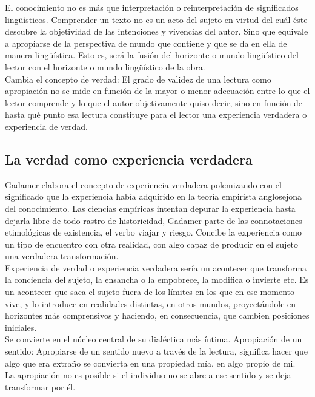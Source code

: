 \documentclass[a4paper, 11pt, twocolumn, spanish]{article}
\begin{document}
El conocimiento no es más que interpretación o reinterpretación de
significados lingüísticos. Comprender un texto no es un acto del
sujeto en virtud del cuál éste descubre la objetividad de las
intenciones y vivencias del autor. Sino que equivale a apropiarse de
la perspectiva de mundo que contiene y que se da en ella de manera
lingüística. Esto es, será la fusión del horizonte o mundo lingüístico
del lector con el horizonte o mundo lingüístico de la obra.\\[0pt]
Cambia el concepto de verdad: El grado de validez de una lectura como
apropiación no se mide en función de la mayor o menor adecuación entre
lo que el lector comprende y lo que el autor objetivamente quiso
decir, sino en función de hasta qué punto esa lectura constituye para
el lector una experiencia verdadera o experiencia de verdad.

\subsection{La verdad como experiencia verdadera}
\label{sec:org273e86a}
Gadamer elabora el concepto de experiencia verdadera polemizando con
el significado que la experiencia había adquirido en la teoría
empirista anglosejona del conocimiento. Las ciencias empíricas intentan
depurar la experiencia hasta dejarla libre de todo rastro de
historicidad, Gadamer parte de las connotaciones etimológicas de
existencia, el verbo viajar y riesgo. Concibe la experiencia como un
tipo de encuentro con otra realidad, con algo capaz de producir en el
sujeto una verdadera transformación.\\[0pt]

Experiencia de verdad o experiencia verdadera sería un acontecer que
transforma la conciencia del sujeto, la ensancha o la empobrece, la
modifica o invierte etc. Es un acontecer que saca el sujeto fuera de
los límites en los que en ese momento vive, y lo introduce en
realidades distintas, en otros mundos, proyectándole en horizontes más
comprensivos y haciendo, en consecuencia, que cambien posiciones
iniciales.\\[0pt]

Se convierte en el núcleo central de su dialéctica más
íntima. Apropiación de un sentido: Apropiarse de un sentido nuevo a
través de la lectura, significa hacer que algo que era extraño se
convierta en una propiedad mía, en algo propio de mi.\\[0pt]
La apropiación no es posible si el individuo no se abre a ese sentido
y se deja transformar por él.\\[0pt]
\end{document}
